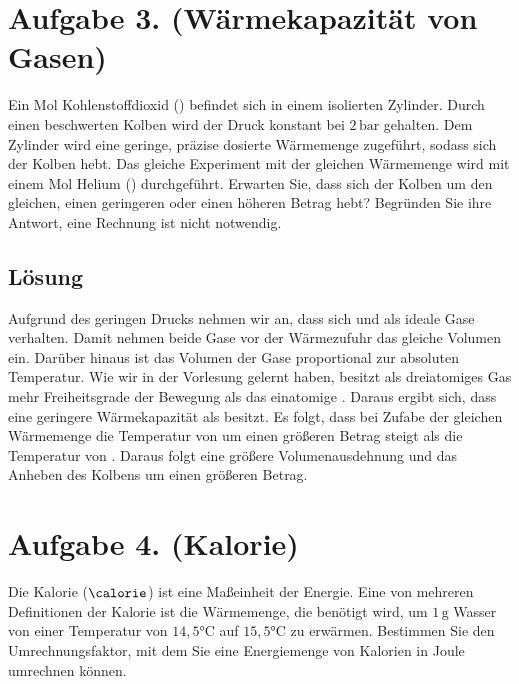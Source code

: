\documentclass[german,12pt]{homework}
\newcommand{\sis}[1]{\,\si{#1}}
\newcommand{\degC}{\si{\degreeCelsius}}
\begin{document}
    \section*{Aufgabe 3. (Wärmekapazität von Gasen)}

    \begin{problem}
        Ein Mol Kohlenstoffdioxid () befindet sich in einem isolierten
        Zylinder. Durch einen beschwerten Kolben wird der Druck konstant bei
        \(2\sis{\bar}\) gehalten. Dem Zylinder wird eine geringe, präzise
        dosierte Wärmemenge zugeführt, sodass sich der Kolben hebt. Das gleiche
        Experiment mit der gleichen Wärmemenge wird mit einem Mol Helium
        () durchgeführt. Erwarten Sie, dass sich der Kolben um den
        gleichen, einen geringeren oder einen höheren Betrag hebt? Begründen
        Sie ihre Antwort, eine Rechnung ist nicht notwendig.
    \end{problem}

    \subsection*{Lösung} Aufgrund des geringen Drucks nehmen wir an, dass sich
     und  als ideale Gase verhalten. Damit nehmen beide Gase vor
    der Wärmezufuhr das gleiche Volumen ein. Darüber hinaus ist das Volumen der
    Gase proportional zur absoluten Temperatur. Wie wir in der Vorlesung
    gelernt haben, besitzt  als dreiatomiges Gas mehr Freiheitsgrade
    der Bewegung als das einatomige . Daraus ergibt sich, dass 
    eine geringere Wärmekapazität als  besitzt. Es folgt, dass bei
    Zufabe der gleichen Wärmemenge die Temperatur von  um einen größeren
    Betrag steigt als die Temperatur von . Daraus folgt eine größere
    Volumenausdehnung und das Anheben des Kolbens um einen größeren Betrag.

    \section*{Aufgabe 4. (Kalorie)}

    \begin{problem}
        Die Kalorie (\(\si{\calorie}\)) ist eine Maßeinheit der Energie. Eine
        von mehreren Definitionen der Kalorie ist die Wärmemenge, die benötigt
        wird, um \(1\sis{\gram}\) Wasser von einer Temperatur von
        \(14,5\degC\) auf \(15,5\degC\) zu
        erwärmen. Bestimmen Sie den Umrechnungsfaktor, mit dem Sie eine
        Energiemenge von Kalorien in Joule umrechnen können.
    \end{problem}
\end{document}
